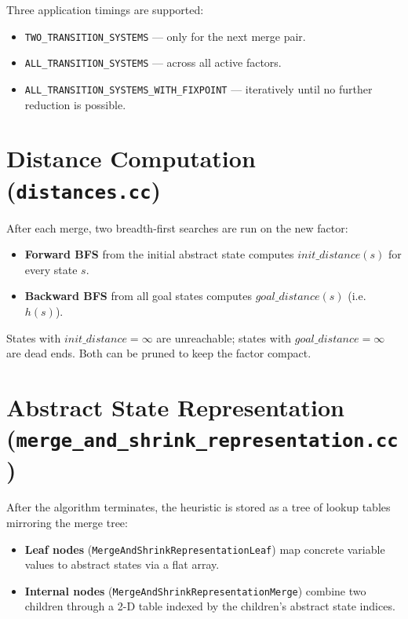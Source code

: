 \documentclass[11pt,a4paper]{article}
\begin{document}
Three application timings are supported:

\begin{itemize}
  \item \texttt{TWO\_TRANSITION\_SYSTEMS} --- only for the next merge pair.
  \item \texttt{ALL\_TRANSITION\_SYSTEMS} --- across all active factors.
  \item \texttt{ALL\_TRANSITION\_SYSTEMS\_WITH\_FIXPOINT} --- iteratively until
        no further reduction is possible.
\end{itemize}

\section{Distance Computation (\texttt{distances.cc})}

After each merge, two breadth-first searches are run on the new factor:

\begin{itemize}
  \item \textbf{Forward BFS} from the initial abstract state computes
        $\mathit{init\_distance}(s)$ for every state $s$.
  \item \textbf{Backward BFS} from all goal states computes
        $\mathit{goal\_distance}(s)$ (i.e.\ $h(s)$).
\end{itemize}

States with $\mathit{init\_distance} = \infty$ are unreachable;
states with $\mathit{goal\_distance} = \infty$ are dead ends.
Both can be pruned to keep the factor compact.

\section{Abstract State Representation (\texttt{merge\_and\_shrink\_representation.cc})}

After the algorithm terminates, the heuristic is stored as a tree of lookup
tables mirroring the merge tree:

\begin{itemize}
  \item \textbf{Leaf nodes} (\texttt{MergeAndShrinkRepresentationLeaf}) map
        concrete variable values to abstract states via a flat array.
  \item \textbf{Internal nodes} (\texttt{MergeAndShrinkRepresentationMerge})
        combine two children through a 2-D table indexed by the children's
        abstract state indices.
\end{itemize}
\end{document}
